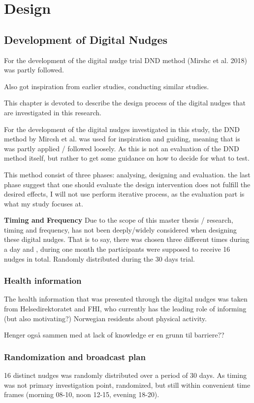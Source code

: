 \chapter{Design}

\section{Development of Digital Nudges} 
For the development of the digital nudge trial DND method (Mirshc et al. 2018) was partly followed. 

Also got inspiration from earlier studies, conducting similar studies. 

This chapter is devoted to describe the design process of the digital nudges that are investigated in this research. 

For the development of the digital nudges investigated in this study, the DND method by Mircsh et al. was used for inspiration and guiding, meaning that is was partly applied / followed loosely. As this is not an evaluation of the DND method itself, but rather to get some guidance on how to decide for what to test. 

This method consist of three phases: analysing, designing and evaluation. the last phase suggest that one should evaluate the design intervention does not fulfill the desired effects, I will not use perform iterative process, as the evaluation part is what my study focuses at. 

\textbf{Timing and Frequency }
Due to the scope of this master thesis / research, timing and frequency, has not been deeply/widely considered when designing these digital nudges.  That is to say, there was chosen three different times during a day and , during one month the participants were supposed to receive 16 nudges in total. Randomly distributed during the 30 days trial.  

\subsection{Health information}
The health information that was presented through the digital nudges was taken from Helsedirektoratet and FHI, who currently has the leading role of informing (but also motivating?) Norwegian residents about physical activity.

Henger også sammen med at lack of knowledge er en grunn til barriere??

\subsection{Randomization and broadcast plan}
16 distinct nudges was randomly distributed over a period of 30 days. As timing was not primary investigation point, randomized, but still within convenient time frames (morning 08-10, noon 12-15, evening 18-20). 

